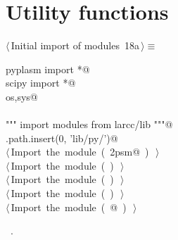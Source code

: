 \documentclass[11pt,oneside]{article}	%
\begin{document}


\appendix
\section{Utility functions}

\begin{flushleft} \small \label{scrap38}
\protect{}$\langle\,$Initial import of modules\nobreak\ {\footnotesize 18a}$\,\rangle\equiv$
\vspace{-1ex}
\begin{list}{}{} \item
\mbox{}\verb@from pyplasm import *@\\
\mbox{}\verb@from scipy import *@\\
\mbox{}\verb@import os,sys@\\
\mbox{}\verb@@\\
\mbox{}\verb@""" import modules from larcc/lib """@\\
\mbox{}\verb@sys.path.insert(0, 'lib/py/')@\\
\mbox{}\verb@@\hbox{$\langle\,$Import the module\nobreak\ ({\footnotesize {}\label{scrap39}
 }\mbox{}\verb@lar2psm@ ) {\footnotesize {}}$\,\rangle$}\verb@@\\
\mbox{}\verb@@\hbox{$\langle\,$Import the module\nobreak\ ({\footnotesize {}\label{scrap40}
 }\mbox{}\verb@simplexn@ ) {\footnotesize {}}$\,\rangle$}\verb@@\\
\mbox{}\verb@@\hbox{$\langle\,$Import the module\nobreak\ ({\footnotesize {}\label{scrap41}
 }\mbox{}\verb@larcc@ ) {\footnotesize {}}$\,\rangle$}\verb@@\\
\mbox{}\verb@@\hbox{$\langle\,$Import the module\nobreak\ ({\footnotesize {}\label{scrap42}
 }\mbox{}\verb@largrid@ ) {\footnotesize {}}$\,\rangle$}\verb@@\\
\mbox{}\verb@@\hbox{$\langle\,$Import the module\nobreak\ ({\footnotesize {}\label{scrap43}
 }\mbox{}@ ) {\footnotesize {}}$\,\rangle$}\verb@@\\
\mbox{}\verb@@{\NWsep}
\end{list}
\vspace{-1ex}
\footnotesize\addtolength{\baselineskip}{-1ex}
\begin{list}{}{\setlength{\itemsep}{-\parsep}\setlength{\itemindent}{-\leftmargin}}
\item \NWtxtMacroRefIn\ .
\end{list}
\end{flushleft}
\end{document}
